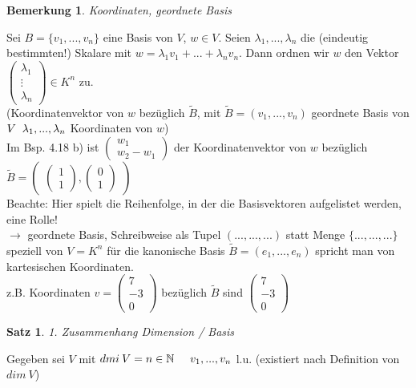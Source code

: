 \documentclass[a4paper,11pt]{article}
\newtheorem{satz}[definition]{Satz}
\newtheorem{bem}[definition]{Bemerkung}
\begin{document}
\begin{bem}
Koordinaten, geordnete Basis
\end{bem}
Sei $B=\{v_1,...,v_n\}$ eine Basis von $V$, $w\in V$. Seien $\lambda_1,...,\lambda_n$ die (eindeutig bestimmten!) Skalare mit $w=\lambda_1v_1+...+\lambda_nv_n$. Dann ordnen wir $w$ den Vektor $\begin{pmatrix}\lambda_1\\\vdots\\\lambda_n\end{pmatrix}\in K^n$ zu. \\
(Koordinatenvektor von $w$ bezüglich $\tilde{B}$, mit $\tilde{B}=(v_1,...,v_n)$ geordnete Basis von $V\hspace{2mm}\lambda_1,...,\lambda_n$ Koordinaten von $w$) \\
Im Bsp. 4.18 b) ist $\begin{pmatrix}w_1\\w_2-w_1\end{pmatrix}$ der Koordinatenvektor von $w$ bezüglich $\tilde{B}=\begin{pmatrix}\begin{pmatrix}1\\1\end{pmatrix}, \begin{pmatrix}0\\1\end{pmatrix}\end{pmatrix}$ \\
Beachte: Hier spielt die Reihenfolge, in der die Basisvektoren aufgelistet werden, eine Rolle! \\
$\rightarrow$ geordnete Basis, Schreibweise als Tupel $(...,...,...)$ statt Menge $\{...,...,...\}$ speziell von $V=K^n$ für die kanonische Basis $\tilde{B}=(e_1,...,e_n)$ spricht man von kartesischen Koordinaten. \\
z.B. Koordinaten $v=\begin{pmatrix}7\\-3\\0\end{pmatrix}$ bezüglich $\tilde{B}$ sind $\begin{pmatrix}7\\-3\\0\end{pmatrix}$
\begin{satz}
1. Zusammenhang Dimension / Basis
\end{satz}
Gegeben sei $V$ mit $dmi\:V=n\in\mathbb{N}\hspace{5mm}v_1,...,v_n$ l.u. (existiert nach Definition von $dim\:V$) \\
\end{document}
